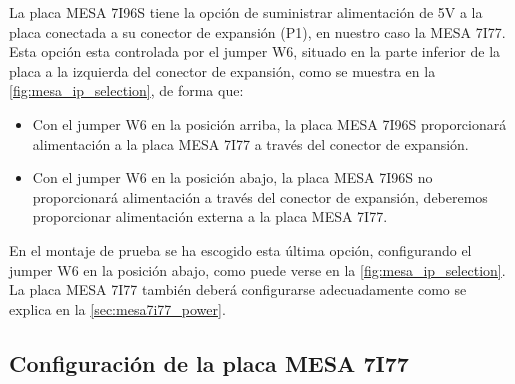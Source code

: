 \documentclass[english,spanish,a4paper,11pt]{article}
\begin{document}
La placa MESA 7I96S tiene la opción de suministrar alimentación de 5V a la placa conectada a su conector de expansión (P1), en nuestro caso la MESA 7I77. Esta opción esta controlada por el jumper W6, situado en la parte inferior de la placa a la izquierda del conector de expansión, como se muestra en la \cref{fig:mesa_ip_selection}, de forma que:
%
\begin{itemize}
    \item Con el jumper W6 en la posición arriba, la placa MESA 7I96S proporcionará alimentación a la placa MESA 7I77 a través del conector de expansión.

    \item Con el jumper W6 en la posición abajo, la placa MESA 7I96S no proporcionará alimentación a través del conector de expansión, deberemos proporcionar alimentación externa a la placa MESA 7I77.
\end{itemize}





En el montaje de prueba se ha escogido esta última opción, configurando el jumper W6 en la posición abajo, como puede verse en la \cref{fig:mesa_ip_selection}. La placa MESA 7I77 también deberá configurarse adecuadamente como se explica en la \cref{sec:mesa7i77_power}.


\subsection{Configuración de la placa MESA 7I77}
\end{document}
